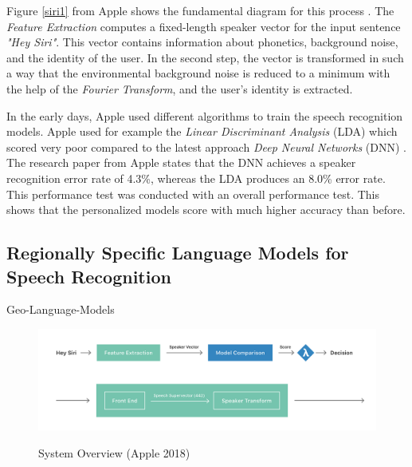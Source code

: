 Figure \ref{siri1} from Apple shows the fundamental diagram for this process \cite{siri2}. The \textit{Feature Extraction} computes a fixed-length speaker vector for the input sentence \textit{"Hey Siri"}. This vector contains information about phonetics, background noise, and the identity of the user. In the second step, the vector is transformed in such a way that the environmental background noise is reduced to a minimum with the help of the \textit{Fourier Transform}, and the user's identity is extracted.

In the early days, Apple used different algorithms to train the speech recognition models. Apple used for example the \textit{Linear Discriminant Analysis} (LDA) which scored very poor compared to the latest approach \textit{Deep Neural Networks} (DNN) \cite{siri1}. The research paper from Apple states that the DNN achieves a speaker recognition error rate of 4.3\%, whereas the LDA produces an 8.0\% error rate. This performance test was conducted with an overall performance test. This shows that the personalized models score with much higher accuracy than before.

\subsection{Regionally Specific Language Models for Speech Recognition}

Geo-Language-Models

\begin{figure}
  \begin{center}
  \includegraphics[width=4.5in]{photos/siri1}\\
  \caption{System Overview (Apple 2018)\cite{siri3}}\label{siri3}
  \end{center}
\end{figure}





